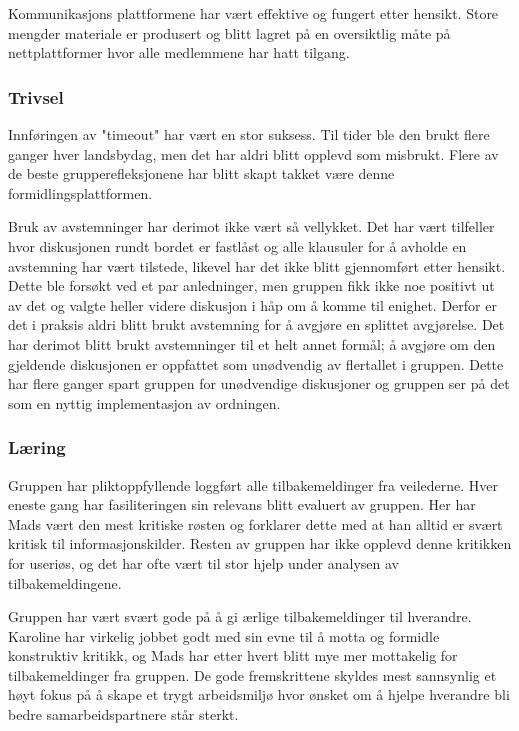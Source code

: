 Kommunikasjons plattformene har vært effektive og fungert etter hensikt. Store mengder materiale er produsert og blitt lagret på en oversiktlig måte på nettplattformer hvor alle medlemmene har hatt tilgang.

\subsubsection{Trivsel}
Innføringen av "timeout" har vært en stor suksess. Til tider ble den brukt flere ganger hver landsbydag, men det har aldri blitt opplevd som misbrukt. Flere av de beste grupperefleksjonene har blitt skapt takket være denne formidlingsplattformen.

Bruk av avstemninger har derimot ikke vært så vellykket. Det har vært tilfeller hvor diskusjonen rundt bordet er fastlåst og alle klausuler for å avholde en avstemning har vært tilstede, likevel har det ikke blitt gjennomført etter hensikt. Dette ble forsøkt ved et par anledninger, men gruppen fikk ikke noe positivt ut av det og valgte heller videre diskusjon i håp om å komme til enighet. Derfor er det i praksis aldri blitt brukt avstemning for å avgjøre en splittet avgjørelse. Det har derimot blitt brukt avstemninger til et helt annet formål; å avgjøre om den gjeldende diskusjonen er oppfattet som unødvendig av flertallet i gruppen. Dette har flere ganger spart gruppen for unødvendige diskusjoner og gruppen ser på det som en nyttig implementasjon av ordningen.

\subsubsection{Læring}
Gruppen har pliktoppfyllende loggført alle tilbakemeldinger fra veilederne. Hver eneste gang har fasiliteringen sin relevans blitt evaluert av gruppen. Her har Mads vært den mest kritiske røsten og forklarer dette med at han alltid er svært kritisk til informasjonskilder. Resten av gruppen har ikke opplevd denne kritikken for useriøs, og det har ofte vært til stor hjelp under analysen av tilbakemeldingene.

Gruppen har vært svært gode på å gi ærlige tilbakemeldinger til hverandre. Karoline har virkelig jobbet godt med sin evne til å motta og formidle konstruktiv kritikk, og Mads har etter hvert blitt mye mer mottakelig for tilbakemeldinger fra gruppen. De gode fremskrittene skyldes mest sannsynlig et høyt fokus på å skape et trygt arbeidsmiljø hvor ønsket om å hjelpe hverandre bli bedre samarbeidspartnere står sterkt.

